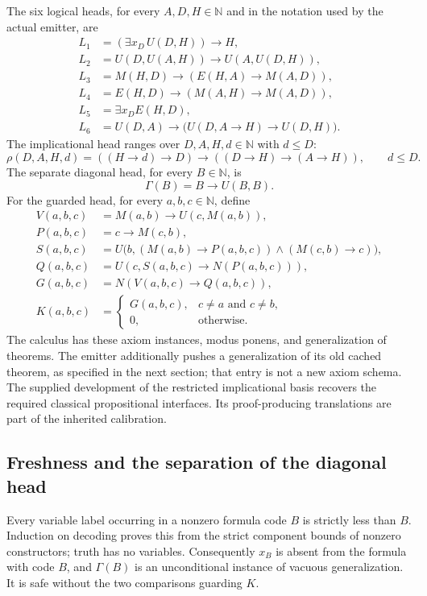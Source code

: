 The six logical heads, for every $A,D,H\in\mathbb N$ and in the notation
used by the actual emitter, are
\begin{align*}
L_1&=(\exists x_D\,U(D,H))\to H,\\
L_2&=U(D,U(A,H))\to U(A,U(D,H)),\\
L_3&=M(H,D)\to(E(H,A)\to M(A,D)),\\
L_4&=E(H,D)\to(M(A,H)\to M(A,D)),\\
L_5&=\exists x_D E(H,D),\\
L_6&=U(D,A)\to\bigl(U(D,A\to H)\to U(D,H)\bigr).
\end{align*}
The implicational head ranges over $D,A,H,d\in\mathbb N$ with $d\le D$:
\[
 \rho(D,A,H,d)=((H\to d)\to D)\to((D\to H)\to(A\to H)),
 \qquad d\le D.
\]
The separate diagonal head, for every $B\in\mathbb N$, is
\[
                    \Gamma(B)=B\to U(B,B).
\]
For the guarded head, for every $a,b,c\in\mathbb N$, define
\begin{align*}
 V(a,b,c)&=M(a,b)\to U(c,M(a,b)),\\
 P(a,b,c)&=c\to M(c,b),\\
 S(a,b,c)&=U\bigl(b,(M(a,b)\to P(a,b,c))\wedge(M(c,b)\to c)\bigr),\\
 Q(a,b,c)&=U(c,S(a,b,c)\to N(P(a,b,c))),\\
 G(a,b,c)&=N(V(a,b,c)\to Q(a,b,c)),\\
 K(a,b,c)&=\begin{cases}G(a,b,c),&c\ne a\text{ and }c\ne b,\\0,&\text{otherwise.}\end{cases}
\end{align*}
The calculus has these axiom instances, modus ponens, and generalization
of theorems. The emitter additionally pushes a generalization of its old
cached theorem, as specified in the next section; that entry is not a new
axiom schema. The supplied development of the restricted implicational
basis recovers the required classical propositional interfaces. Its
proof-producing translations are part of the inherited calibration.

\subsection{Freshness and the separation of the diagonal head}

Every variable label occurring in a nonzero formula code $B$ is strictly
less than $B$. Induction on decoding proves this from the strict component
bounds of nonzero constructors; truth has no variables. Consequently
$x_B$ is absent from the formula with code $B$, and $\Gamma(B)$ is an
unconditional instance of vacuous generalization. It is safe without the
two comparisons guarding $K$.

